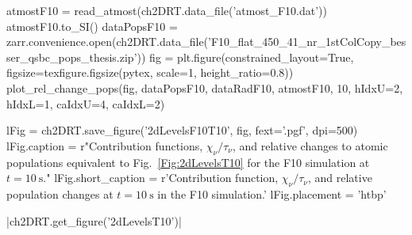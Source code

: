 \begin{pycode}[2DRT]
atmostF10 = read_atmost(ch2DRT.data_file('atmost_F10.dat'))
atmostF10.to_SI()
dataPopsF10 = zarr.convenience.open(ch2DRT.data_file('F10_flat_450_41_nr_1stColCopy_besser_qsbc_pops_thesis.zip'))
fig = plt.figure(constrained_layout=True, figsize=texfigure.figsize(pytex, scale=1, height_ratio=0.8))
plot_rel_change_pops(fig, dataPopsF10, dataRadF10, atmostF10, 10, hIdxU=2, hIdxL=1, caIdxU=4, caIdxL=2)

lFig = ch2DRT.save_figure('2dLevelsF10T10', fig, fext='.pgf', dpi=500)
lFig.caption = r"Contribution functions, $\chi_\nu/\tau_\nu$, and relative changes to atomic populations equivalent to Fig.~\ref{Fig:2dLevelsT10} for the F10 simulation at $t=\SI{10}{\second}$."
lFig.short_caption = r'Contribution function, $\chi_\nu/\tau_\nu$, and relative population changes at $t=\SI{10}{\second}$ in the F10 simulation.'
lFig.placement =  'htbp'

\end{pycode}

\py[2DRT]|ch2DRT.get_figure('2dLevelsT10')|

